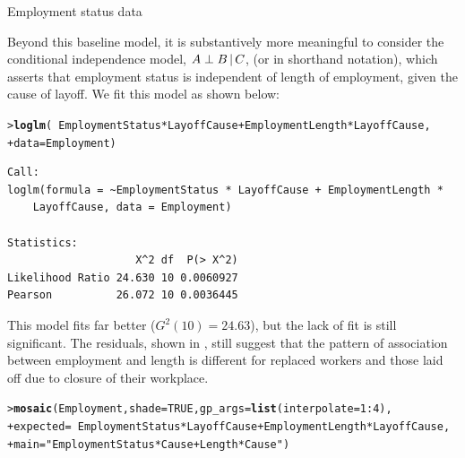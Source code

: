 \documentclass[10pt,krantz2]{krantz}\usepackage[]{graphicx}\usepackage[]{color}
\makeatletter
\newcommand{\hlnum}[1]{\textcolor[rgb]{0.686,0.059,0.569}{#1}}%
\newcommand{\hlstr}[1]{\textcolor[rgb]{0.192,0.494,0.8}{#1}}%
\newcommand{\hlopt}[1]{\textcolor[rgb]{0,0,0}{#1}}%
\newcommand{\hlstd}[1]{\textcolor[rgb]{0.345,0.345,0.345}{#1}}%
\newcommand{\hlkwc}[1]{\textcolor[rgb]{0.333,0.667,0.333}{#1}}%
\newcommand{\hlkwd}[1]{\textcolor[rgb]{0.737,0.353,0.396}{\textbf{#1}}}%
\newenvironment{kframe}{%
 \def\at@end@of@kframe{}%
 \ifinner\ifhmode%
  \def\at@end@of@kframe{\end{minipage}}%
  \begin{minipage}{\columnwidth}%
 \fi\fi%
 \def\FrameCommand##1{\hskip\@totalleftmargin \hskip-\fboxsep
 \colorbox{shadecolor}{##1}\hskip-\fboxsep
     \hskip-\linewidth \hskip-\@totalleftmargin \hskip\columnwidth}%
 \MakeFramed {\advance\hsize-\width
   \@totalleftmargin\z@ \linewidth\hsize
   \@setminipage}}%
 {\par\unskip\endMakeFramed%
 \at@end@of@kframe}
\newenvironment{knitrout}{}{} %
\renewenvironment{knitrout}{\small\renewcommand{\baselinestretch}{.85}}{} %
\makeatother
\begin{document}
\begin{Example}[employ]{Employment status data}
\begin{knitrout}
\end{knitrout}

Beyond this baseline model, it is substantively more meaningful to consider the
conditional independence model, \(A \perp B \, | \, C\),
(or  in shorthand notation), which asserts that
employment status is independent of length of employment, given the cause of layoff.
We fit this model as shown below:
\begin{knitrout}
\color{fgcolor}\begin{kframe}
\begin{alltt}
\hlstd{> }\hlkwd{loglm}\hlstd{(}\hlopt{~} \hlstd{EmploymentStatus} \hlopt{*} \hlstd{LayoffCause} \hlopt{+} \hlstd{EmploymentLength} \hlopt{*} \hlstd{LayoffCause,}
\hlstd{+ }      \hlkwc{data} \hlstd{= Employment)}
\end{alltt}
\begin{verbatim}
Call:
loglm(formula = ~EmploymentStatus * LayoffCause + EmploymentLength * 
    LayoffCause, data = Employment)

Statistics:
                    X^2 df  P(> X^2)
Likelihood Ratio 24.630 10 0.0060927
Pearson          26.072 10 0.0036445
\end{verbatim}
\end{kframe}
\end{knitrout}
This model fits far better (\(G^2 (10) = 24.63\)),
but the lack of fit is still significant.
The residuals, shown in , still
suggest that the pattern of association between employment and length
is different for replaced workers and those laid off due to closure of their workplace.

\begin{knitrout}
\color{fgcolor}\begin{kframe}
\begin{alltt}
\hlstd{> }\hlkwd{mosaic}\hlstd{(Employment,} \hlkwc{shade} \hlstd{=} \hlnum{TRUE}\hlstd{,} \hlkwc{gp_args} \hlstd{=} \hlkwd{list}\hlstd{(}\hlkwc{interpolate} \hlstd{=} \hlnum{1} \hlopt{:} \hlnum{4}\hlstd{),}
\hlstd{+ }       \hlkwc{expected} \hlstd{=} \hlopt{~} \hlstd{EmploymentStatus} \hlopt{*} \hlstd{LayoffCause} \hlopt{+} \hlstd{EmploymentLength} \hlopt{*} \hlstd{LayoffCause,}
\hlstd{+ }       \hlkwc{main} \hlstd{=} \hlstr{"EmploymentStatus * Cause + Length * Cause"}\hlstd{)}
\end{alltt}
\end{kframe}\begin{figure}[!htbp]


\end{figure}
\end{knitrout}
\end{Example}
\end{document}
